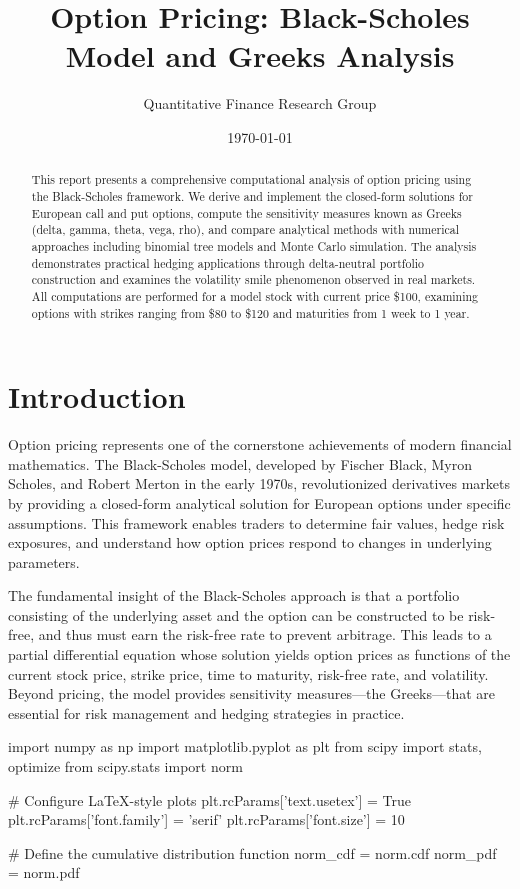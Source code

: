 \documentclass[a4paper, 11pt]{article}
\title{Option Pricing: Black-Scholes Model and Greeks Analysis}
\author{Quantitative Finance Research Group}
\date{\today}
\begin{document}
\maketitle

\begin{abstract}
This report presents a comprehensive computational analysis of option pricing using the Black-Scholes framework. We derive and implement the closed-form solutions for European call and put options, compute the sensitivity measures known as Greeks (delta, gamma, theta, vega, rho), and compare analytical methods with numerical approaches including binomial tree models and Monte Carlo simulation. The analysis demonstrates practical hedging applications through delta-neutral portfolio construction and examines the volatility smile phenomenon observed in real markets. All computations are performed for a model stock with current price \$100, examining options with strikes ranging from \$80 to \$120 and maturities from 1 week to 1 year.
\end{abstract}

\section{Introduction}

Option pricing represents one of the cornerstone achievements of modern financial mathematics. The Black-Scholes model, developed by Fischer Black, Myron Scholes, and Robert Merton in the early 1970s, revolutionized derivatives markets by providing a closed-form analytical solution for European options under specific assumptions. This framework enables traders to determine fair values, hedge risk exposures, and understand how option prices respond to changes in underlying parameters.

The fundamental insight of the Black-Scholes approach is that a portfolio consisting of the underlying asset and the option can be constructed to be risk-free, and thus must earn the risk-free rate to prevent arbitrage. This leads to a partial differential equation whose solution yields option prices as functions of the current stock price, strike price, time to maturity, risk-free rate, and volatility. Beyond pricing, the model provides sensitivity measures—the Greeks—that are essential for risk management and hedging strategies in practice.

\begin{pycode}
import numpy as np
import matplotlib.pyplot as plt
from scipy import stats, optimize
from scipy.stats import norm

# Configure LaTeX-style plots
plt.rcParams['text.usetex'] = True
plt.rcParams['font.family'] = 'serif'
plt.rcParams['font.size'] = 10

# Define the cumulative distribution function
norm_cdf = norm.cdf
norm_pdf = norm.pdf
\end{pycode}
\end{document}
